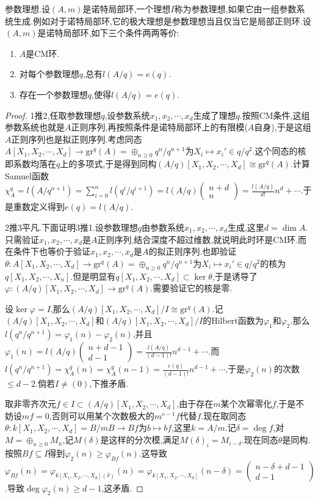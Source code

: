 参数理想.设$(A,m)$是诺特局部环,一个理想$I$称为参数理想,如果它由一组参数系统生成.例如对于诺特局部环,它的极大理想是参数理想当且仅当它是局部正则环.设$(A,m)$是诺特局部环,如下三个条件两两等价:
\begin{enumerate}
	\item $A$是CM环.
	\item 对每个参数理想$q$,总有$l(A/q)=e(q)$.
	\item 存在一个参数理想$q$,使得$l(A/q)=e(q)$.
\end{enumerate}
\begin{proof}
	
	1推2,任取参数理想$q$,设参数系统$x_1,x_2,\cdots,x_d$生成了理想$q$.按照CM条件,这组参数系统也就是$A$正则序列,再按照条件是诺特局部环上的有限模($A$自身),于是这组$A$正则序列也是拟正则序列.考虑同态$A[X_1,X_2,\cdots,X_d]\to\mathrm{gr}^q(A)=\oplus_{n\ge0}q^n/q^{n+1}$为$X_i\mapsto x_i'\in q/q^2$.这个同态的核即系数均落在$q$上的多项式,于是得到同构$(A/q)[X_1,X_2,\cdots,X_d]\cong\mathrm{gr}^q(A)$.计算Samuel函数$\chi_A^q=l(A/q^{n+1})=\sum_{i=0}^nl(q^i/q^{i+1})=l(A/q)\left(\begin{array}{c}n+d\\n\end{array}\right)=\frac{l(A/q)}{d!}n^d+\cdots$.于是重数定义得到$e(q)=l(A/q)$.
	
	2推3平凡.下面证明3推1.设参数理想$q$由参数系统$x_1,x_2,\cdots,x_d$生成,这里$d=\dim A$.只需验证$x_1,x_2,\cdots,x_d$是$A$正则序列,结合深度不超过维数,就说明此时环是CM环.而在条件下也等价于验证$x_1,x_2,\cdots,x_d$是$A$的拟正则序列.也即验证$\theta:A[X_1,X_2,\cdots,X_d]\to\mathrm{gr}^q(A)=\oplus_{n\ge0}q^n/q^{n+1}$为$X_i\mapsto x_i'\in q/q^2$的核为$q[X_1,X_2,\cdots,X_n]$.但是明显有$q[X_1,X_2,\cdots,X_d]\subset\ker\theta$,于是诱导了$\varphi:(A/q)[X_1,X_2,\cdots,X_d]\to\mathrm{gr}^q(A)$.需要验证它的核是零.
	
	设$\ker\varphi=I$,那么$(A/q)[X_1,X_2,\cdots,X_d]/I\cong\mathrm{gr}^q(A)$.记$(A/q)[X_1,X_2,\cdots,X_d]$和$(A/q)[X_1,X_2,\cdots,X_d]/I$的Hilbert函数为$\varphi_1$和$\varphi_2$.那么$l(q^n/q^{n+1})=\varphi_1(n)-\varphi_2(n)$,并且$\varphi_1(n)=l(A/q)\left(\begin{array}{c}n+d-1\\d-1\end{array}\right)=\frac{l(A/q)}{(d-1)!}n^{d-1}+\cdots$.而$l(q^n/q^{n+1})=\chi_A^q(n)=\chi_A^q(n-1)=\frac{e(q)}{(d-1)!}n^{d-1}+\cdots$,于是$\varphi_2(n)$的次数$\le d-2$.倘若$I\not=(0)$,下推矛盾.
	
	取非零齐次元$f\in I\subset(A/q)[X_1,X_2,\cdots,X_d]$,由于存在$m$某个次幂零化$f$,于是不妨设$mf=0$,否则可以用某个次数极大的$m^{v-1}f$代替$f$.现在取同态$\theta:k[X_1,X_2,\cdots,X_d]=B/mB\to Bf$为$b\mapsto bf$,这里$k=A/m$.记$\delta=\deg f$,对$M=\oplus_{n\ge0}M_n$,记$M(\delta)$是这样的分次模,满足$M(\delta)_i=M_{i-\delta}$.现在同态$\theta$是同构.按照$Bf\subseteq I$得到$\varphi_2(n)\ge\varphi_{Bf}(n)$.这导致$\varphi_{Bf}(n)=\varphi_{k[X_1,X_2,\cdots,X_d](\delta)}(n)=\varphi_{k[X_1,X_2,\cdots,X_d]}(n-\delta)=\left(\begin{array}{c}n-\delta+d-1\\d-1\end{array}\right)$.导致$\deg\varphi_2(n)\ge d-1$,这矛盾.
\end{proof}
\newpage
